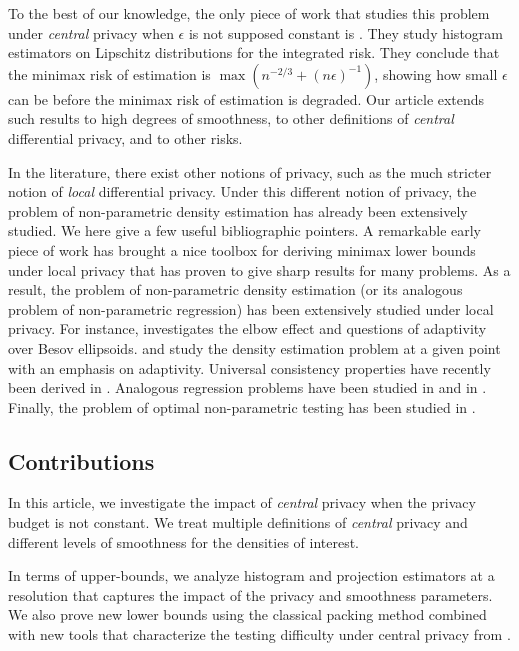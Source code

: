 \documentclass[10pt]{article} %
\newcommand\p[1]{\left( {#1}\right)}
\newcommand\B[1]{{#1}}
\begin{document}
To the best of our knowledge, the only piece of work that studies this problem under \emph{\B{central}} privacy when $\epsilon$ is not supposed constant is \citet{barber2014privacy}. They study histogram estimators on Lipschitz distributions for the integrated risk. They conclude that the minimax risk of estimation is $\max \p{n^{-2/3} + (n\epsilon)^{-1}}$, showing how small $\epsilon$ can be before the minimax risk of estimation is degraded. Our article extends such results to high degrees of smoothness, to other definitions of \emph{\B{central}} differential privacy, and to other risks.

In the literature, \B{there exist other notions of privacy, such as the much stricter notion of \emph{local} differential privacy. Under this different notion of privacy, the problem of non-parametric density estimation has already been extensively studied. We here give a few useful bibliographic pointers.} A remarkable early piece of work \cite{duchi2018minimax} has brought a nice toolbox for deriving minimax lower bounds under local privacy that has proven to give sharp results for many problems. As a result, the problem of non-parametric density estimation (or its analogous problem of non-parametric regression) has been extensively studied under local privacy. For instance, \citet{butucea2020local} investigates the elbow effect and questions of adaptivity over Besov ellipsoids. \citet{kroll2021density} and \citet{schluttenhofer2022adaptive} study the density estimation problem at a given point with an emphasis on adaptivity. Universal consistency properties have recently been derived in \citet{gyorfi2023multivariate}. Analogous regression problems have been studied in \citet{berrett2021strongly} and in \citet{gyorfi2022rate}. Finally, the problem of optimal non-parametric testing has been studied in \citet{lam2022minimax}.


\subsection{Contributions}

In this article, we investigate the impact of \emph{\B{central}} privacy when the privacy budget is not constant. We treat multiple definitions of \emph{\B{central}} privacy and different levels of smoothness for the densities of interest. 

In terms of upper-bounds, we analyze histogram and projection estimators at a resolution that captures the impact of the privacy and smoothness parameters. We also prove new lower bounds using the classical packing method combined with new tools that characterize the testing difficulty under \B{central} privacy from \citet{acharya2021differentially,kamath2022improved,lalanne2022statistical}.
\end{document}
